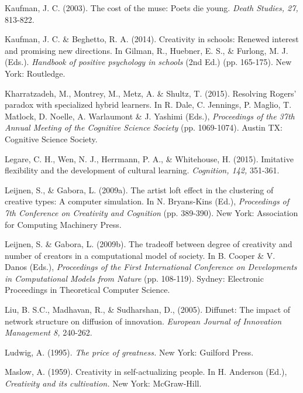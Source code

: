 \documentclass[a4paper,12pt,man,british]{apa6}
\begin{document}
\begin{description}
\item Kaufman, J. C. (2003). The cost of the muse: Poets die young. \emph{Death Studies, 27,} 813-822.

\item Kaufman, J. C. \& Beghetto, R. A. (2014). Creativity in schools: Renewed interest and promising new directions. In Gilman, R., Huebner, E. S., \& Furlong, M. J.  (Eds.). \emph{Handbook of positive psychology in schools} (2nd Ed.) (pp. 165-175). New York: Routledge.

\item Kharratzadeh, M., Montrey, M., Metz, A. \& Shultz, T. (2015). Resolving Rogers' paradox with specialized hybrid learners. In R. Dale, C. Jennings, P. Maglio, T. Matlock, D. Noelle, A. Warlaumont \& J. Yashimi (Eds.), \emph{Proceedings of the 37th Annual Meeting of the Cognitive Science Society} (pp. 1069-1074). Austin TX: Cognitive Science Society. 

\item Legare, C. H., Wen, N. J., Herrmann, P. A., \& Whitehouse, H. (2015). Imitative flexibility and the development of cultural learning. \emph{Cognition, 142,} 351-361. 

\item Leijnen, S., \& Gabora, L. (2009a). The artist loft effect in the clustering of creative types: A computer simulation. In N. Bryans-Kins (Ed.), \emph{Proceedings of 7th Conference on Creativity and Cognition} (pp. 389-390). New York: Association for Computing Machinery Press.

\item Leijnen, S. \& Gabora, L. (2009b). The tradeoff between degree of creativity and number of creators in a computational model of society. In B. Cooper \& V. Danos (Eds.), \emph{Proceedings of the First International Conference on Developments in Computational Models from Nature} (pp. 108-119). Sydney: Electronic Proceedings in Theoretical Computer Science.

\item Liu, B. S.C., Madhavan, R., \& Sudharshan, D., (2005). Diffunet: The impact of network structure on diffusion of innovation. \emph{European Journal of Innovation Management 8,} 240-262.

\item Ludwig, A. (1995). \emph{The price of greatness.} New York: Guilford Press.

\item Maslow, A. (1959). Creativity in self-actualizing people. In H. Anderson (Ed.), \emph{Creativity and its cultivation.} New York: McGraw-Hill.


\end{description}
\end{document}
